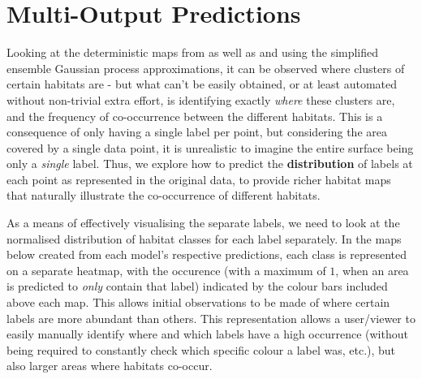 \section{Multi-Output Predictions} \label{chapsec:dm}

Looking at the deterministic maps from  as well as  and  using the simplified ensemble Gaussian process approximations, it can be observed where clusters of certain habitats are - but what can't be easily obtained, or at least automated without non-trivial extra effort, is identifying exactly \textit{where} these clusters are, and the frequency of co-occurrence between the different habitats. This is a consequence of only having a single label per point, but considering the area covered by a single data point, it is unrealistic to imagine the entire surface being only a \textit{single} label. Thus, we explore how to predict the \textbf{distribution} of labels at each point as represented in the original data, to provide richer habitat maps that naturally illustrate the co-occurrence of different habitats.

As a means of effectively visualising the separate labels, we need to look at the normalised distribution of habitat classes for each label separately. In the maps below created from each model's respective predictions, each class is represented on a separate heatmap, with the occurence (with a maximum of $1$, when an area is predicted to \textit{only} contain that label) indicated by the colour bars included above each map. This allows initial observations to be made of where certain labels are more abundant than others. This representation allows a user/viewer to easily manually identify where and which labels have a high occurrence (without being required to constantly check which specific colour a label was, etc.), but also larger areas where habitats co-occur.

